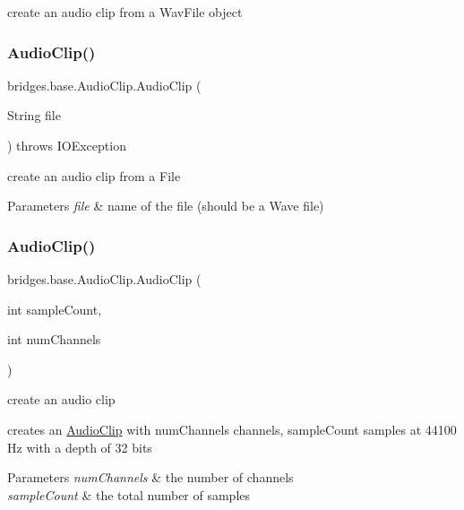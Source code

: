 create an audio clip from a Wav\+File object 

\mbox{\label{classbridges_1_1base_1_1_audio_clip_a70d5f6f10dad6da2f27bb04b7021e2fa}} 
\subsubsection{\texorpdfstring{Audio\+Clip()}{AudioClip()}\hspace{0.1cm}{\footnotesize\ttfamily [3/4]}}
{\footnotesize\ttfamily bridges.\+base.\+Audio\+Clip.\+Audio\+Clip (\begin{DoxyParamCaption}\item[{String}]{file }\end{DoxyParamCaption}) throws I\+O\+Exception}



create an audio clip from a File 


\begin{DoxyParams}{Parameters}
{\em file} & name of the file (should be a Wave file) \\
\hline
\end{DoxyParams}
\mbox{\label{classbridges_1_1base_1_1_audio_clip_aca2a5258c29b104bf8216ae5ec3c5938}} 
\subsubsection{\texorpdfstring{Audio\+Clip()}{AudioClip()}\hspace{0.1cm}{\footnotesize\ttfamily [4/4]}}
{\footnotesize\ttfamily bridges.\+base.\+Audio\+Clip.\+Audio\+Clip (\begin{DoxyParamCaption}\item[{int}]{sample\+Count,  }\item[{int}]{num\+Channels }\end{DoxyParamCaption})}



create an audio clip 

creates an \hyperlink{classbridges_1_1base_1_1_audio_clip}{Audio\+Clip} with num\+Channels channels, sample\+Count samples at 44100 Hz with a depth of 32 bits 
\begin{DoxyParams}{Parameters}
{\em num\+Channels} & the number of channels \\
\hline
{\em sample\+Count} & the total number of samples \\
\hline
\end{DoxyParams}


